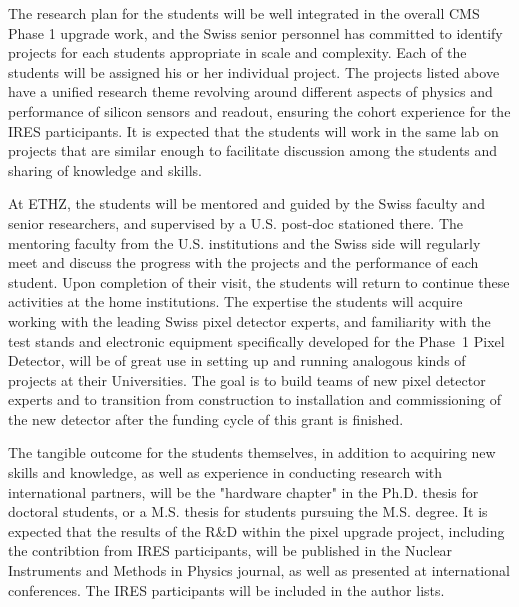 The research plan for the students will be well integrated in the
overall CMS Phase 1 upgrade work, and the Swiss senior personnel has
committed to identify projects for each students appropriate in scale
and complexity. Each of the students will be assigned his or her
individual project. The projects listed above have a unified research
theme revolving around different aspects of physics and performance of
silicon sensors and readout, ensuring the cohort experience for the
IRES participants. It is expected that the students will work in the
same lab on projects that are similar enough to facilitate discussion
among the students and sharing of knowledge and skills. 

At ETHZ, the students will be mentored and guided by the Swiss faculty
and senior researchers, and supervised by a U.S. post-doc stationed
there.  The mentoring faculty from the U.S. institutions and the Swiss
side will regularly meet and discuss the progress with the projects
and the performance of each student.  Upon completion of their visit,
the students will return to continue these activities at the home
institutions.  The expertise the students will acquire working with
the leading Swiss pixel detector experts, and familiarity with the
test stands and electronic equipment specifically developed for the
Phase~1 Pixel Detector, will be of great use in setting up and running
analogous kinds of projects at their Universities.
The goal is to build teams of new pixel detector experts and to
transition from construction to installation and commissioning of the
new detector after the funding cycle of this grant is finished.

The tangible outcome for the students themselves, in addition to
acquiring new skills and knowledge, as well as experience in
conducting research with international partners, will be the "hardware
chapter" in the Ph.D. thesis for doctoral students, or a M.S. thesis
for students pursuing the M.S. degree. It is expected that the results
of the R\&D within the pixel upgrade project, including the
contribtion from IRES participants, will be published in the Nuclear
Instruments and Methods in Physics journal, as well as presented at
international conferences. The IRES participants will be included in
the author lists.
